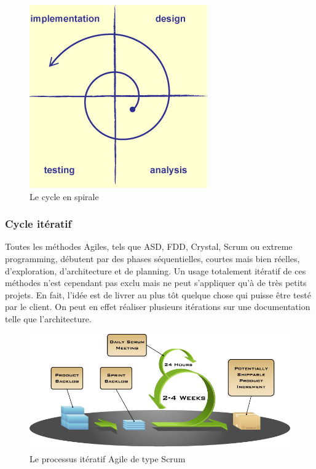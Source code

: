 \begin{figure}[h]
\begin{center}
    \includegraphics[scale=0.5]{img/spiral-model}
    \caption{Le cycle en spirale}
	\label{spiral-model}
\end{center}
\end{figure}

\subsubsection{Cycle itératif}

Toutes les méthodes Agiles, tels que ASD, FDD, Crystal, Scrum ou extreme programming,  débutent par des phases séquentielles, courtes mais bien réelles, d'exploration, d'architecture et de planning. Un usage totalement itératif de ces méthodes n'est cependant pas exclu mais ne peut s'appliquer qu'à de très petits projets. En fait, l'idée est de livrer au plus tôt quelque chose qui puisse être testé par le client. On peut en effet réaliser plusieurs itérations sur une documentation telle que l'architecture. 

\begin{figure}[h]
\begin{center}
    \includegraphics[scale=0.5]{img/scrum}
    \caption{Le processus itératif Agile de type Scrum}
	\label{scrum}
\end{center}
\end{figure}

